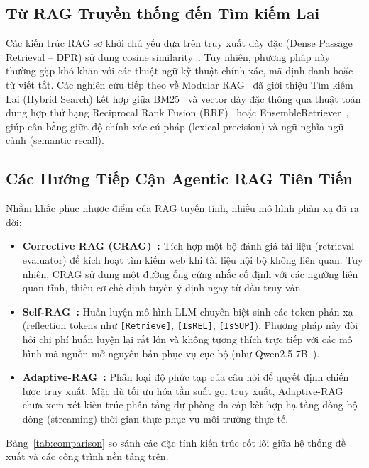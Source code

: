 \documentclass[conference]{IEEEtran}
\begin{document}
\subsection{Từ RAG Truyền thống đến Tìm kiếm Lai}
Các kiến trúc RAG sơ khởi chủ yếu dựa trên truy xuất dày đặc (Dense Passage Retrieval -- DPR) sử dụng cosine similarity~\cite{lewis2020retrieval, karpukhin2020dense, chroma2023, reimers2019sentence}. Tuy nhiên, phương pháp này thường gặp khó khăn với các thuật ngữ kỹ thuật chính xác, mã định danh hoặc từ viết tắt. Các nghiên cứu tiếp theo về Modular RAG~\cite{gao2023modular} đã giới thiệu Tìm kiếm Lai (Hybrid Search) kết hợp giữa BM25~\cite{robertson2009probabilistic} và vector dày đặc thông qua thuật toán dung hợp thứ hạng Reciprocal Rank Fusion (RRF)~\cite{cormack2009reciprocal} hoặc EnsembleRetriever~\cite{ensemble2023}, giúp cân bằng giữa độ chính xác cú pháp (lexical precision) và ngữ nghĩa ngữ cảnh (semantic recall).

\subsection{Các Hướng Tiếp Cận Agentic RAG Tiên Tiến}
Nhằm khắc phục nhược điểm của RAG tuyến tính, nhiều mô hình phản xạ đã ra đời:
\begin{itemize}
    \item \textbf{Corrective RAG (CRAG)~\cite{yan2024corrective}:} Tích hợp một bộ đánh giá tài liệu (retrieval evaluator) để kích hoạt tìm kiếm web khi tài liệu nội bộ không liên quan. Tuy nhiên, CRAG sử dụng một đường ống cứng nhắc cố định với các ngưỡng liên quan tĩnh, thiếu cơ chế định tuyến ý định ngay từ đầu truy vấn.
    \item \textbf{Self-RAG~\cite{asai2023self}:} Huấn luyện mô hình LLM chuyên biệt sinh các token phản xạ (reflection tokens như \texttt{[Retrieve]}, \texttt{[IsREL]}, \texttt{[IsSUP]}). Phương pháp này đòi hỏi chi phí huấn luyện lại rất lớn và không tương thích trực tiếp với các mô hình mã nguồn mở nguyên bản phục vụ cục bộ (như Qwen2.5 7B~\cite{qwen2024}).
    \item \textbf{Adaptive-RAG~\cite{jeong2024adaptive}:} Phân loại độ phức tạp của câu hỏi để quyết định chiến lược truy xuất. Mặc dù tối ưu hóa tần suất gọi truy xuất, Adaptive-RAG chưa xem xét kiến trúc phân tầng dự phòng đa cấp kết hợp hạ tầng đồng bộ dòng (streaming) thời gian thực phục vụ môi trường thực tế.
\end{itemize}

Bảng~\ref{tab:comparison} so sánh các đặc tính kiến trúc cốt lõi giữa hệ thống đề xuất và các công trình nền tảng trên.
\end{document}
